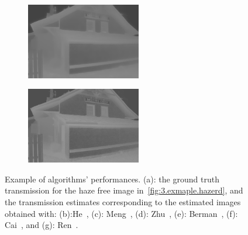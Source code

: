 \begin{figure}[htb]
\begin{subfigure}[b]{0.45\linewidth}
  \subcaption{}
\end{subfigure}
\vfill
\begin{subfigure}[b]{0.45\linewidth}
  \centering
  \centerline{\includegraphics[width=5cm]{hazerd/img/cai}}
  \subcaption{}
\end{subfigure}
\hfill
\begin{subfigure}[b]{0.45\linewidth}
  \centering
  \centerline{\includegraphics[width=5cm]{hazerd/img/ren}}
  \subcaption{}
\end{subfigure}
\vfill
\caption{Example of algorithms' performances. (a): the ground truth transmission for the haze free image in~\ref{fig:3.exmaple.hazerd}, and the transmission estimates corresponding to the estimated images obtained with: (b):He~\cite{he2011single}, (c): Meng~\cite{meng2013efficient}, (d): Zhu~\cite{zhu2015fast}, (e): Berman~\cite{berman2016non}, (f): Cai~\cite{cai2016dehazenet}, and (g): Ren~\cite{Ren-ECCV-2016}.}
\label{fig:3.exmaple.hazerd.trans}
\end{figure}
